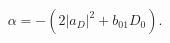\begin{equation}
\alpha =-\left( 2\left| a_{D}\right| ^{2}+{b}_{01}D_0\right) .
\label{critpara}
\end{equation}

